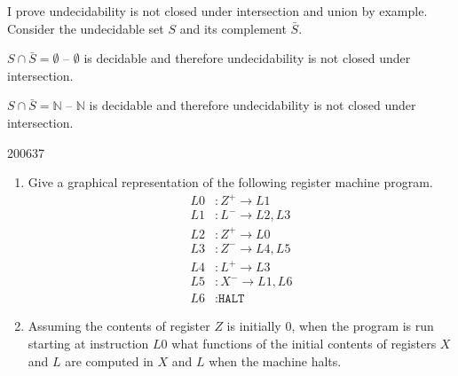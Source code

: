 \documentclass[10pt,\jkfside,a4paper]{article}
\begin{document}
\begin{enumerate}[label=(\alph*)]
I prove undecidability is not closed under intersection and union by
example. Consider the undecidable set $S$ and its complement $\bar{S}$.

$S \cap \bar{S} = \emptyset$ -- $\emptyset$ is decidable and therefore
undecidability is not closed under intersection.

$S \cap \bar{S} = \mathbb{N}$ -- $\mathbb{N}$ is decidable and therefore
undecidability is not closed under intersection.

\end{enumerate}

\begin{examquestion}{2006}{3}{7}

\begin{enumerate}

\item Give a graphical representation of the following register machine
program.
\begin{align*}
L0 &: Z^+ \to L1 \\
L1 &: L^- \to L2, L3 \\
L2 &: Z^+ \to L0 \\
L3 &: Z^- \to L4, L5 \\
L4 &: L^+ \to L3 \\
L5 &: X^- \to L1, L6 \\
L6 &: \texttt{HALT}
\end{align*}

\begin{center}
\end{center}

\item Assuming the contents of register $Z$ is initially 0, when the program
is run starting at instruction $L0$ what functions of the initial contents
of registers $X$ and $L$ are computed in $X$ and $L$ when the machine halts.


\end{enumerate}
\end{examquestion}
\end{document}
